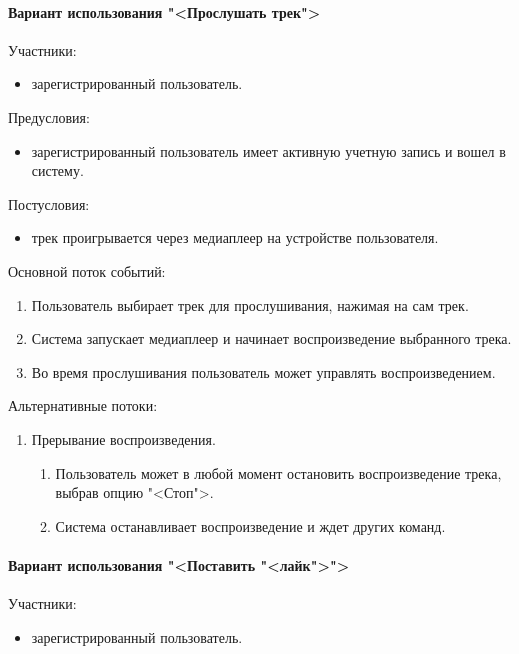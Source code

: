 \paragraph{Вариант использования "<Прослушать трек">}

Участники:
\begin{itemize}
	\item зарегистрированный пользователь.
\end{itemize}

Предусловия:
\begin{itemize}
	\item зарегистрированный пользователь имеет активную учетную запись и вошел в систему.
\end{itemize}

Постусловия:
\begin{itemize}
	\item трек проигрывается через медиаплеер на устройстве пользователя.
\end{itemize}

Основной поток событий:
\begin{enumerate}
	\item Пользователь выбирает трек для прослушивания, нажимая на сам трек.
	\item Система запускает медиаплеер и начинает воспроизведение выбранного трека.
	\item Во время прослушивания пользователь может управлять воспроизведением.
\end{enumerate}

Альтернативные потоки:
\begin{enumerate}
	\item Прерывание воспроизведения.
	\begin{enumerate}
		\item Пользователь может в любой момент остановить воспроизведение трека, выбрав опцию "<Стоп">.
		\item Система останавливает воспроизведение и ждет других команд.
	\end{enumerate}
\end{enumerate}

\paragraph{Вариант использования "<Поставить "<лайк">">}

Участники:
\begin{itemize}
	\item зарегистрированный пользователь.
\end{itemize}

